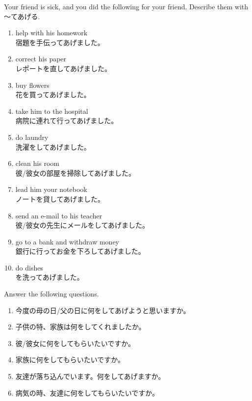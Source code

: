 \documentclass[notoc,notitlepage]{tufte-book}
\begin{document}
\begin{ex}
  Your friend is sick, and you did the following for your friend. Describe them with 〜てあげる.

  \begin{enumerate}
    \item help with his homework \\
      宿題を手伝ってあげました。
    \item correct his paper \\
      レポートを直してあげました。
    \item buy flowers \\
      花を買ってあげました。
    \item take him to the hospital \\
      病院に連れて行ってあげました。
    \item do laundry \\
      洗濯をしてあげました。
    \item clean his room \\
      彼/彼女の部屋を掃除してあげました。
    \item lead him your notebook \\
      ノートを貸してあげました。
    \item send an e-mail to his teacher \\
      彼/彼女の先生にメールをしてあげました。
    \item go to a bank and withdraw money \\
      銀行に行ってお金を下ろしてあげました。
    \item do dishes \\
      を洗ってあげました。
  \end{enumerate}
\end{ex}

\begin{ex}
  Answer the following questions.
  \begin{enumerate}
    \item 今度の母の日/父の日に何をしてあげようと思いますか。
    \item 子供の特、家族は何をしてくれましたか。
    \item 彼/彼女に何をしてもらいたいですか。
    \item 家族に何をしてもらいたいですか。
    \item 友達が落ち込んでいます。何をしてあげますか。
    \item 病気の時、友達に何をしてもらいたいですか。
  \end{enumerate}
\end{ex}
\end{document}
